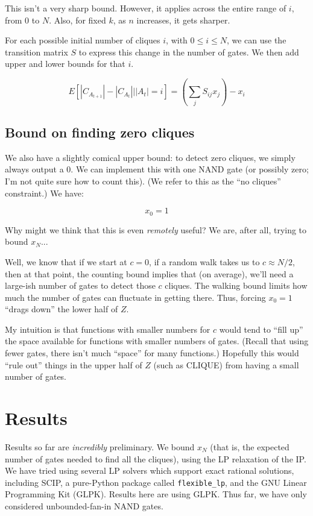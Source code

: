 \documentclass[12pt]{article}
\theoremstyle{definition}
\begin{document}
This isn't a very sharp bound. However, it applies across the entire
range of $i$, from 0 to $N$. Also, for fixed $k$, as $n$ increases,
it gets sharper.

For each possible initial number of cliques $i$, with $0 \le i \le N$,
we can use the transition matrix $S$ to express this change in the
number of gates. We then add upper and lower bounds for that $i$.

\[
E[ |C_{A_{t+1}}| - |C_{A_t}| | |A_t|=i ] = (\sum_j S_{ij} x_j) - x_i
\]

\subsection{Bound on finding zero cliques}

We also have a slightly comical upper bound:
to detect zero cliques, we simply always
output a 0. We can implement this with one NAND gate (or possibly zero;
I'm not quite sure how to count this). (We refer to this as the
``no cliques'' constraint.) We have:

\[
x_0 = 1
\]

Why might we think that this is even {\em remotely} useful? We are, after
all, trying to bound $x_N$...

Well, we know that if we start at $c=0$, if a random walk takes us to
$c \approx N/2$, then at that point, the counting bound implies that
(on average), we'll need a large-ish number of gates to detect those $c$ cliques.
The walking bound limits how much the number of gates can fluctuate
in getting there. Thus, forcing $x_0=1$ ``drags down'' the lower half of $Z$.

My intuition is that functions with smaller numbers for $c$ would
tend to ``fill up'' the space available for functions with smaller numbers of gates.
(Recall that using fewer gates, there isn't much ``space'' for many functions.)
Hopefully this would ``rule out'' things in the upper half of $Z$ (such as CLIQUE)
from having a small number of gates.

\section{Results}

Results so far are {\em incredibly} preliminary. We bound $x_N$
(that is, the expected number of gates needed to find all the cliques),
using the LP relaxation of the IP. We have tried using several
LP solvers which support exact rational solutions,
including SCIP, a pure-Python package called {\tt flexible\_lp},
and the GNU Linear Programming Kit (GLPK). Results here are
using GLPK. Thus far, we have only considered unbounded-fan-in
NAND gates.
\end{document}
